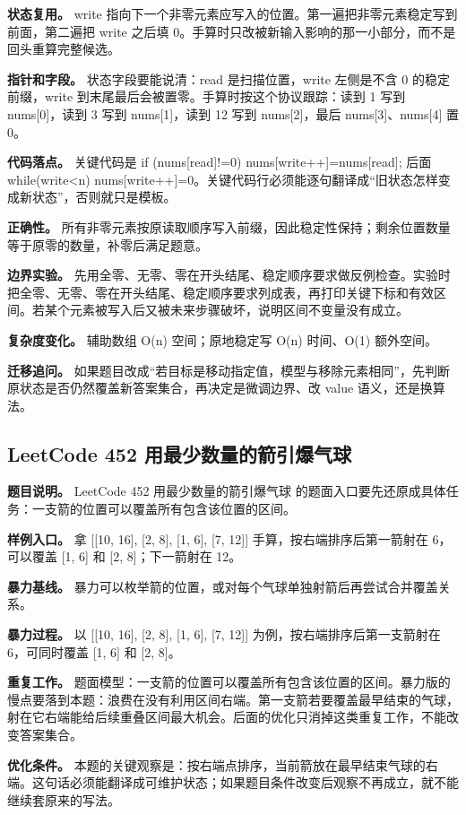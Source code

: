 \textbf{状态复用。} write 指向下一个非零元素应写入的位置。第一遍把非零元素稳定写到前面，第二遍把 write 之后填 0。手算时只改被新输入影响的那一小部分，而不是回头重算完整候选。

\textbf{指针和字段。} 状态字段要能说清：read 是扫描位置，write 左侧是不含 0 的稳定前缀，write 到末尾最后会被置零。手算时按这个协议跟踪：读到 1 写到 nums[0]，读到 3 写到 nums[1]，读到 12 写到 nums[2]，最后 nums[3]、nums[4] 置 0。

\textbf{代码落点。} 关键代码是 if (nums[read]!=0) nums[write++]=nums[read]; 后面 while(write<n) nums[write++]=0。关键代码行必须能逐句翻译成“旧状态怎样变成新状态”，否则就只是模板。

\textbf{正确性。} 所有非零元素按原读取顺序写入前缀，因此稳定性保持；剩余位置数量等于原零的数量，补零后满足题意。

\textbf{边界实验。} 先用全零、无零、零在开头结尾、稳定顺序要求做反例检查。实验时把全零、无零、零在开头结尾、稳定顺序要求列成表，再打印关键下标和有效区间。若某个元素被写入后又被未来步骤破坏，说明区间不变量没有成立。

\textbf{复杂度变化。} 辅助数组 O(n) 空间；原地稳定写 O(n) 时间、O(1) 额外空间。

\textbf{迁移追问。} 如果题目改成“若目标是移动指定值，模型与移除元素相同”，先判断原状态是否仍然覆盖新答案集合，再决定是微调边界、改 value 语义，还是换算法。

\subsection{LeetCode 452 用最少数量的箭引爆气球}

\textbf{题目说明。} LeetCode 452 用最少数量的箭引爆气球 的题面入口要先还原成具体任务：一支箭的位置可以覆盖所有包含该位置的区间。

\textbf{样例入口。} 拿 [[10, 16], [2, 8], [1, 6], [7, 12]] 手算，按右端排序后第一箭射在 6，可以覆盖 [1, 6] 和 [2, 8]；下一箭射在 12。

\textbf{暴力基线。} 暴力可以枚举箭的位置，或对每个气球单独射箭后再尝试合并覆盖关系。

\textbf{暴力过程。} 以 [[10, 16], [2, 8], [1, 6], [7, 12]] 为例，按右端排序后第一支箭射在 6，可同时覆盖 [1, 6] 和 [2, 8]。

\textbf{重复工作。} 题面模型：一支箭的位置可以覆盖所有包含该位置的区间。暴力版的慢点要落到本题：浪费在没有利用区间右端。第一支箭若要覆盖最早结束的气球，射在它右端能给后续重叠区间最大机会。后面的优化只消掉这类重复工作，不能改变答案集合。

\textbf{优化条件。} 本题的关键观察是：按右端点排序，当前箭放在最早结束气球的右端。这句话必须能翻译成可维护状态；如果题目条件改变后观察不再成立，就不能继续套原来的写法。

